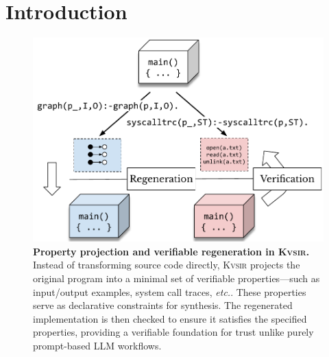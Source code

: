 \documentclass[sigplan,review,anonymous,10pt]{acmart}
\def\etc{{\em etc.}\xspace}
\newcommand{\sys}{{\scshape Kv{\textalpha}sir}\xspace}
\begin{document}
\maketitle

\section{Introduction}

\begin{figure}[t]
  \includegraphics[width=.9\columnwidth]{figs/kvasir_projection.pdf}
  \caption{\textbf{Property projection and verifiable regeneration in \sys.}
  Instead of transforming source code directly, \sys projects the original
  program into a minimal set of verifiable properties---such as input/output
  examples, system call traces, \etc.
  These properties serve as declarative
  constraints for synthesis.
  The regenerated implementation is then checked to
  ensure it satisfies the specified properties, providing a verifiable
  foundation for trust unlike purely prompt-based LLM workflows.}
  \label{fig:projection}
\end{figure}
\end{document}
